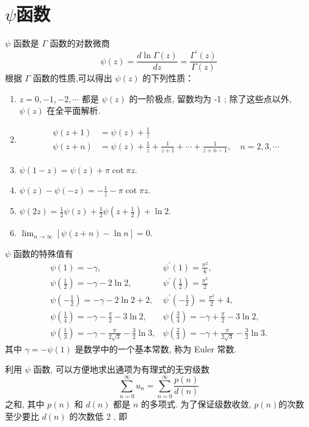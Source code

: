 \section{\texorpdfstring{$\psi$}{psi}函数}
$\psi$ 函数是 $\Gamma$ 函数的对数微商
\begin{equation}
    \psi(z)=\frac{d \ln \Gamma(z)}{d z}=\frac{\Gamma^{\prime}(z)}{\Gamma(z)}
\end{equation}
根据 $\Gamma$ 函数的性质,可以得出 $\psi(z)$ 的下列性质：

\begin{enumerate}
    \item $z=0,-1,-2, \cdots$ 都是 $\psi(z)$ 的一阶极点, 留数均为 -1 ; 除了这些点以外, $\psi(z)$ 在全平面解析.
    \item $$
    \begin{aligned}
    \psi(z+1) & =\psi(z)+\frac{1}{z} \\
    \psi(z+n) & =\psi(z)+\frac{1}{z}+\frac{1}{z+1}+\cdots+\frac{1}{z+n-1}, \quad n=2,3, \cdots
    \end{aligned}
    $$
    \item   $\psi(1-z)=\psi(z)+\pi \cot \pi z$.
    \item  $\psi(z)-\psi(-z)=-\frac{1}{z}-\pi \cot \pi z$.
    \item  $\psi(2 z)=\frac{1}{2} \psi(z)+\frac{1}{2} \psi\left(z+\frac{1}{2}\right)+\ln 2$.
    \item  $\lim _{n \rightarrow \infty}[\psi(z+n)-\ln n]=0$.
\end{enumerate}

$\psi$ 函数的特殊值有
$$
\begin{array}{ll}
\psi(1)=-\gamma, & \psi^{\prime}(1)=\frac{\pi^{2}}{6}, \\
\psi\left(\frac{1}{2}\right)=-\gamma-2 \ln 2, & \psi^{\prime}\left(\frac{1}{2}\right)=\frac{\pi^{2}}{2} \\
\psi\left(-\frac{1}{2}\right)=-\gamma-2 \ln 2+2, & \psi^{\prime}\left(-\frac{1}{2}\right)=\frac{\pi^{2}}{2}+4, \\
\psi\left(\frac{1}{4}\right)=-\gamma-\frac{\pi}{2}-3 \ln 2, & \psi\left(\frac{3}{4}\right)=-\gamma+\frac{\pi}{2}-3 \ln 2, \\
\psi\left(\frac{1}{3}\right)=-\gamma-\frac{\pi}{2 \sqrt{3}}-\frac{3}{2} \ln 3, & \psi\left(\frac{2}{3}\right)=-\gamma+\frac{\pi}{2 \sqrt{3}}-\frac{3}{2} \ln 3 .
\end{array}
$$
其中 $\gamma=-\psi(1)$ 是数学中的一个基本常数, 称为 Euler 常数.


利用 $\psi$ 函数, 可以方便地求出通项为有理式的无穷级数
$$
\sum_{n=0}^{\infty} u_{n}=\sum_{n=0}^{\infty} \frac{p(n)}{d(n)}
$$
之和, 其中 $p(n)$ 和 $d(n)$ 都是 $n$ 的多项式. 为了保证级数收敛, $p(n)$的次数至少要比 $d(n)$ 的次数低 2 , 即

